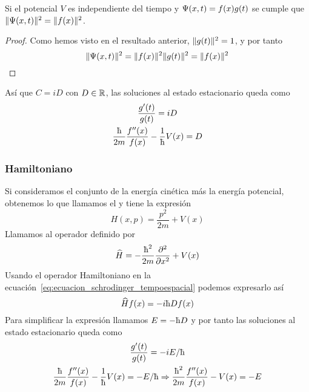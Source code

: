 \begin{resultado}
    Si el potencial $V$ es independiente del tiempo y $\Psi(x,t)=f(x)g(t)$ se cumple que $\lVert\Psi(x,t)\rVert^2=\lVert f(x)\rVert^2$.
\end{resultado}
\begin{proof}
    Como hemos visto en el resultado anterior, $\lVert g(t)\rVert^2=1$, y por tanto
    \begin{equation}
        \label{eq:probabilidad_atemporal}
        \lVert\Psi(x,t)\rVert^2=\lVert f(x)\rVert^2\lVert g(t)\rVert^2=\lVert f(x)\rVert^2
    \end{equation}
\end{proof}
Así que $C=iD$ con $D\in\mathbb{R}$, las soluciones al estado estacionario queda como
\begin{gather*}
    \frac{g'(t)}{g(t)}=iD
    \\
    \frac{\planckbarsymbol}{2m}\frac{f''(x)}{f(x)}-\frac{1}{\planckbarsymbol}V(x)=D
\end{gather*}

\subsubsection{Hamiltoniano}
Si consideramos el conjunto de la energía cinética más la energía potencial, obtenemos lo que llamamos el  y tiene la expresión
\begin{equation}
    \label{eq:halmitoniano}
    H(x,p)=\frac{p^2}{2m}+V(x)
\end{equation}
Llamamos  al operador definido por
\begin{equation}
    \label{eq:operador_hamiltoniano}
    \widehat{H}=-\frac{\planckbarsymbol^2}{2m}\frac{\partial^2}{\partial x^2}+V(x)
\end{equation}
Usando el operador Hamiltoniano en la ecuación~\eqref{eq:ecuacion_schrodinger_tempoespacial} podemos expresarlo así
\begin{equation*}
    \widehat{H}f(x)=-i\planckbarsymbol Df(x)
\end{equation*}
Para simplificar la expresión llamamos $E=-\planckbarsymbol D$ y por tanto las soluciones al estado estacionario queda como
\begin{gather*}
    \frac{g'(t)}{g(t)}=-iE/\planckbarsymbol
    \\
    \frac{\planckbarsymbol}{2m}\frac{f''(x)}{f(x)}-\frac{1}{\planckbarsymbol}V(x)=-E/\planckbarsymbol\Rightarrow \frac{\planckbarsymbol^2}{2m}\frac{f''(x)}{f(x)}-V(x)=-E
\end{gather*}

